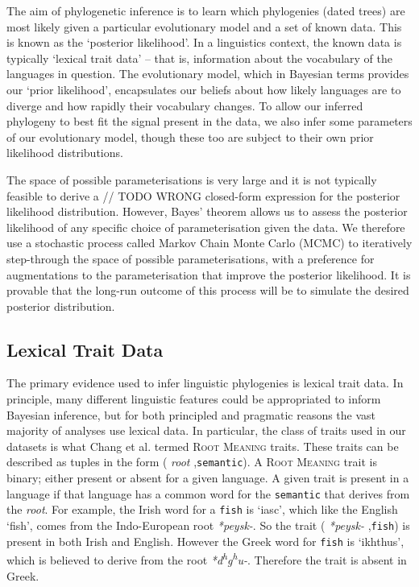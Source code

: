 \documentclass[10pt,journal,compsoc]{IEEEtran}
\newcommand{\ts}{\textsuperscript}
\begin{document}
The aim of phylogenetic inference is to learn which phylogenies (dated trees) are most likely given a particular evolutionary model and a set of known data. This is known as the `posterior likelihood'. In a linguistics context, the known data is typically `lexical trait data' -- that is, information about the vocabulary of the languages in question. The evolutionary model, which in Bayesian terms provides our `prior likelihood', encapsulates our beliefs about how likely languages are to diverge and how rapidly their vocabulary changes. To allow our inferred phylogeny to best fit the signal present in the data, we also infer some parameters of our evolutionary model, though these too are subject to their own prior likelihood distributions.

The space of possible parameterisations is very large and it is not typically feasible to derive a // TODO WRONG closed-form expression for the posterior likelihood distribution. However, Bayes' theorem allows us to assess the posterior likelihood of any specific choice of parameterisation given the data. We therefore use a stochastic process called Markov Chain Monte Carlo (MCMC) to iteratively step-through the space of possible parameterisations, with a preference for augmentations to the parameterisation that improve the posterior likelihood. It is provable that the long-run outcome of this process will be to simulate the desired posterior distribution.

\subsection{Lexical Trait Data}

The primary evidence used to infer linguistic phylogenies is lexical trait data. In principle, many different linguistic features could be appropriated to inform Bayesian inference, but for both principled and pragmatic reasons the vast majority of analyses use lexical data. In particular, the class of traits used in our datasets is what Chang et al. termed \textsc{Root Meaning} traits. These traits can be described as tuples in the form (\textit{ root },\;\texttt{semantic}\;). A \textsc{Root Meaning} trait is binary; either present or absent for a given language. A given trait is present in a language if that language has a common word for the \texttt{semantic} that derives from the \textit{root}. For example, the Irish word for a \texttt{fish} is `iasc', which like the English `fish', comes from the Indo-European root \textit{*peysk-}. So the trait (\textit{ *peysk- },\;\texttt{fish}\;) is present in both Irish and English. However the Greek word for \texttt{fish} is `ikhthus', which is believed to derive from the root \textit{*d\ts{h}g\ts{h}u-}. Therefore the trait is absent in Greek.
\end{document}
